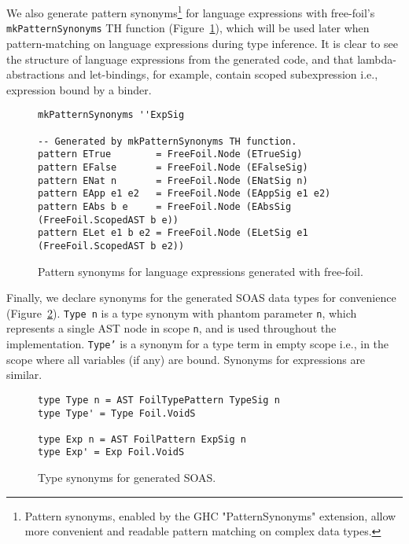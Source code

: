 We also generate pattern synonyms\footnote{Pattern synonyms, enabled by the GHC "PatternSynonyms" extension, allow more convenient and readable pattern matching on complex data types.} for language expressions with free-foil's \texttt{mkPatternSynonyms} TH function (Figure~\ref{fig:soas-gen-exprs}), which will be used later when pattern-matching on language expressions during type inference. It is clear to see the structure of language expressions from the generated code, and that lambda-abstractions and let-bindings, for example, contain scoped subexpression i.e., expression bound by a binder.

\begin{figure}[H]
\begin{verbatim}
mkPatternSynonyms ''ExpSig

-- Generated by mkPatternSynonyms TH function.
pattern ETrue        = FreeFoil.Node (ETrueSig) 
pattern EFalse       = FreeFoil.Node (EFalseSig)
pattern ENat n       = FreeFoil.Node (ENatSig n)
pattern EApp e1 e2   = FreeFoil.Node (EAppSig e1 e2)
pattern EAbs b e     = FreeFoil.Node (EAbsSig (FreeFoil.ScopedAST b e))
pattern ELet e1 b e2 = FreeFoil.Node (ELetSig e1 (FreeFoil.ScopedAST b e2))
\end{verbatim}
  \caption[Generating SOAS (2): pattern synonyms for expressions]{Pattern synonyms for language expressions generated with free-foil.}
  \label{fig:soas-gen-exprs}
\end{figure}

Finally, we declare synonyms for the generated SOAS data types for convenience (Figure~\ref{fig:soas-type-synonyms}). \texttt{Type n} is a type synonym with phantom parameter \texttt{n}, which represents a single AST node in scope \texttt{n}, and is used throughout the implementation. \texttt{Type'} is a synonym for a type term in empty scope i.e., in the scope where all variables (if any) are bound. Synonyms for expressions are similar.

\begin{figure}[H]
\begin{verbatim}
type Type n = AST FoilTypePattern TypeSig n
type Type' = Type Foil.VoidS

type Exp n = AST FoilPattern ExpSig n
type Exp' = Exp Foil.VoidS
\end{verbatim}
  \caption[Generating SOAS (3): type synonyms]{Type synonyms for generated SOAS.}
  \label{fig:soas-type-synonyms}
\end{figure}

